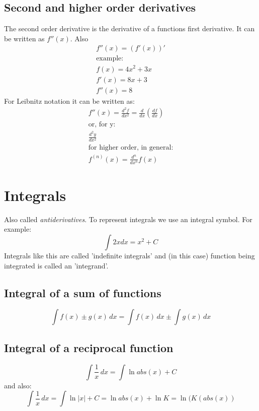 \documentclass{article}
\begin{document}
\subsection{Second and higher order derivatives}
The second order derivative is the derivative of a functions first derivative.
It can be written as $f''(x)$. Also
\begin{equation}
  \begin{gathered}
    f''(x) = (f'(x))' \\
    \text{example:} \\
    f(x) = 4x^2 + 3x \\
    f'(x) = 8x+3 \\
    f''(x) = 8
  \end{gathered}
\end{equation}
For Leibnitz notation it can be written as:
\begin{equation}
  \begin{gathered}
    f''(x) = \frac{d^2f}{dx^2} = \frac{d}{dx}(\frac{df}{dx}) \\
    \text{or, for y:} \\
    \frac{d^2y}{dx^2} \\
    \text{for higher order, in general:} \\
    f^{(n)}(x) = \frac{d^n}{dx^n}f(x)
  \end{gathered}
\end{equation}
\section{Integrals}
Also called \textit{antiderivatives}. To represent integrals we use an integral
symbol. For example:
\begin{equation}
  \int 2x dx = x^2 + C
\end{equation}
Integrals like this are called 'indefinite integrals' and (in this case)
function being integrated is called an 'integrand'.

\subsection{Integral of a sum of functions}
\begin{equation}
  \int f(x) \pm g(x) \, dx = \int f(x) \, dx \pm \int g(x) \, dx
\end{equation}

\subsection{Integral of a reciprocal function}
\begin{equation}
  \int \frac{1}{x} \, dx = \int \ln abs(x) + C
\end{equation}
and also:
\begin{equation}
  \int \frac{1}{x} \, dx = \int \ln|x| + C = \ln abs(x) + \ln K = \ln (K (abs(x))
\end{equation}
\end{document}
